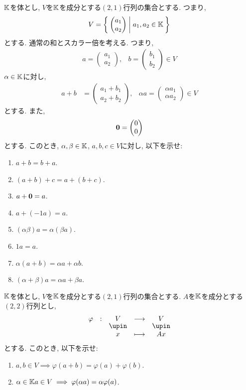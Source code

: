 \begin{quiz}
  $\mathbb{K}$を体とし, $V$を$\mathbb{K}$を成分とする$(2,1)$行列の集合とする.
  つまり,
  \begin{align*}
    V=\Set{\begin{pmatrix}a_1\\a_2\end{pmatrix}|a_1,a_2\in \mathbb{K}}
  \end{align*}
  とする. 通常の和とスカラー倍を考える.  つまり,
  \begin{align*}
    a=\begin{pmatrix}a_1\\a_2\end{pmatrix}, & b=\begin{pmatrix}b_1\\b_2\end{pmatrix} \in V
  \end{align*}
  $\alpha\in\mathbb{K}$に対し,
  \begin{align*}
    a+b&=\begin{pmatrix}a_1+b_1\\a_2+b_2\end{pmatrix}, & \alpha a=\begin{pmatrix}\alpha a_1\\\alpha a_2\end{pmatrix} \in V
  \end{align*}
  とする. また,
  \begin{align*}
  \boldsymbol{0}=
  \begin{pmatrix}
    0\\0
  \end{pmatrix}
  \end{align*}
  とする.
  このとき, $\alpha,\beta\in\mathbb{K}$, $a,b,c\in V$に対し, 以下を示せ:
  \begin{enumerate}
    \item $a+b=b+a$.
    \item $(a+b)+c=a+(b+c)$.
    \item $a+\boldsymbol{0}=a$.
    \item $a+(-1 a)=a$.
    \item $(\alpha\beta)a=\alpha(\beta a)$.
    \item $1a=a$.
    \item $\alpha(a+b)=\alpha a+\alpha b$.
    \item $(\alpha+\beta)a=\alpha a+\beta a$.
  \end{enumerate}
\end{quiz}

\begin{quiz}
  $\mathbb{K}$を体とし, $V$を$\mathbb{K}$を成分とする$(2,1)$行列の集合とする.
  $A$を$\mathbb{K}$を成分とする$(2,2)$行列とし,
  \begin{align*}
    \shazo{\varphi}{V}{V}{x}{Ax}
  \end{align*}
  とする.
  このとき, 以下を示せ:
  \begin{enumerate}
    \item $a,b\in V\implies \varphi(a+b)=\varphi(a)+\varphi(b)$.
    \item $\alpha\in\mathbb{K} a\in V\implies \varphi(\alpha a)=\alpha\varphi(a)$.
  \end{enumerate}
\end{quiz}

